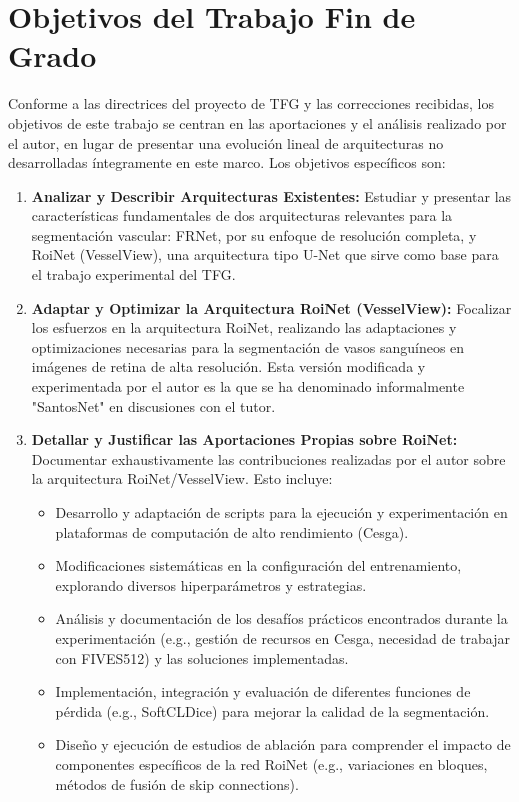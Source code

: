 \documentclass[11pt,a4paper]{report} %
\begin{document}
\chapter{Objetivos del Trabajo Fin de Grado}
Conforme a las directrices del proyecto de TFG y las correcciones recibidas, los objetivos de este trabajo se centran en las aportaciones y el análisis realizado por el autor, en lugar de presentar una evolución lineal de arquitecturas no desarrolladas íntegramente en este marco. Los objetivos específicos son:
\begin{enumerate}
  \item \textbf{Analizar y Describir Arquitecturas Existentes:} Estudiar y presentar las características fundamentales de dos arquitecturas relevantes para la segmentación vascular: FRNet, por su enfoque de resolución completa, y RoiNet (VesselView), una arquitectura tipo U-Net que sirve como base para el trabajo experimental del TFG.
  \item \textbf{Adaptar y Optimizar la Arquitectura RoiNet (VesselView):} Focalizar los esfuerzos en la arquitectura RoiNet, realizando las adaptaciones y optimizaciones necesarias para la segmentación de vasos sanguíneos en imágenes de retina de alta resolución. Esta versión modificada y experimentada por el autor es la que se ha denominado informalmente "SantosNet" en discusiones con el tutor.
  \item \textbf{Detallar y Justificar las Aportaciones Propias sobre RoiNet:} Documentar exhaustivamente las contribuciones realizadas por el autor sobre la arquitectura RoiNet/VesselView. Esto incluye:
    \begin{itemize}
        \item Desarrollo y adaptación de scripts para la ejecución y experimentación en plataformas de computación de alto rendimiento (Cesga).
        \item Modificaciones sistemáticas en la configuración del entrenamiento, explorando diversos hiperparámetros y estrategias.
        \item Análisis y documentación de los desafíos prácticos encontrados durante la experimentación (e.g., gestión de recursos en Cesga, necesidad de trabajar con FIVES512) y las soluciones implementadas.
        \item Implementación, integración y evaluación de diferentes funciones de pérdida (e.g., SoftCLDice) para mejorar la calidad de la segmentación.
        \item Diseño y ejecución de estudios de ablación para comprender el impacto de componentes específicos de la red RoiNet (e.g., variaciones en bloques, métodos de fusión de skip connections).

\end{itemize}
\end{enumerate}
\end{document}
